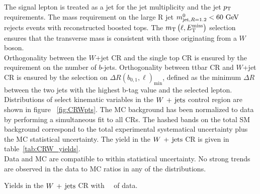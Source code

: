 \indent The signal lepton is treated as a jet for the jet multiplicity and the jet $p_{\mathrm{T}}$ requirements.  The mass requirement on the large R jet $\mantikttwelvezero < 60 \gev$ rejects events with reconstructed boosted tops.  The $m_{\mathrm{T}}\left(\ell,E_{\mathrm{T}}^{\mathrm{miss}}\right)$ selection ensures that the transverse mass is consistent with those originating from a $W$ boson.  \\

\indent Orthogonality between the $W$+jet CR and the single top CR is ensured by the requirement on the number of $b$-jets.  Orthogonality between ttbar CR and $W$+jet CR is ensured by the selection on $\Delta R(b_{0,1},\ell)_{\mathrm{min}}$, defined as the minimum $\Delta R$ between the two jets with the highest b-tag value and the selected lepton.  \\

\indent  Distributions of select kinematic variables in the $W\,+\,\mathrm{jets}$ control region are shown in figure ~\ref{fig:CRWpts}.  The MC background has been normalized to data by performing a simultaneous fit to all CRs.  The hashed bands on the total SM background correspond to the total experimental systematical uncertainty plus the MC statistical uncertainty.  The yield in the $W\,+\,\mathrm{jets}$ CR is given in table~\ref{tab:CRW_yields}.  \\

\indent  Data and MC are compatible to within statistical uncertainty.  No strong trends are observed in the data to MC ratios in any of the distributions. \\

\begin{table}[!htb]
  \centering
  
  \caption{Yields in the $W\,+\,\mathrm{jets}$ CR with \intlumi\ \ifb\ of data.  }
  \label{tab:CRW_yields}
\end{table}

